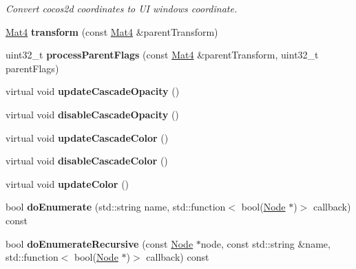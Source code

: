 \begin{DoxyCompactItemize}
\begin{DoxyCompactList}\small\item\em Convert cocos2d coordinates to UI windows coordinate. \end{DoxyCompactList}\item 
\mbox{\label{classNode_ac2c42b42f83093c1c2eec1c85db42da3}} 
\hyperlink{classMat4}{Mat4} {\bfseries transform} (const \hyperlink{classMat4}{Mat4} \&parent\+Transform)
\item 
\mbox{\label{classNode_adafbbfd4c342d5b49900279af703fd6a}} 
uint32\+\_\+t {\bfseries process\+Parent\+Flags} (const \hyperlink{classMat4}{Mat4} \&parent\+Transform, uint32\+\_\+t parent\+Flags)
\item 
\mbox{\label{classNode_a9605f03a838df163865754fd5563ef4e}} 
virtual void {\bfseries update\+Cascade\+Opacity} ()
\item 
\mbox{\label{classNode_a0ebd230a088bf8617f176d8ba5d5d342}} 
virtual void {\bfseries disable\+Cascade\+Opacity} ()
\item 
\mbox{\label{classNode_af73c6c7509327024e982f1441b9c1be3}} 
virtual void {\bfseries update\+Cascade\+Color} ()
\item 
\mbox{\label{classNode_a81e70cde53de8a61e9843e7ca9f245f1}} 
virtual void {\bfseries disable\+Cascade\+Color} ()
\item 
\mbox{\label{classNode_a2704ff7c772030d210ffe5d7efce75a2}} 
virtual void {\bfseries update\+Color} ()
\item 
\mbox{\label{classNode_abc25589657cd89b6790ee1df8db05e48}} 
bool {\bfseries do\+Enumerate} (std\+::string name, std\+::function$<$ bool(\hyperlink{classNode}{Node} $\ast$)$>$ callback) const
\item 
\mbox{\label{classNode_ab02e31227d3de70ff6b1b58ebf25d39a}} 
bool {\bfseries do\+Enumerate\+Recursive} (const \hyperlink{classNode}{Node} $\ast$node, const std\+::string \&name, std\+::function$<$ bool(\hyperlink{classNode}{Node} $\ast$)$>$ callback) const
\item 
\mbox{\label{classNode_ac777c670caf6e0369cc07bd6ffd26292}} 

\end{DoxyCompactItemize}

